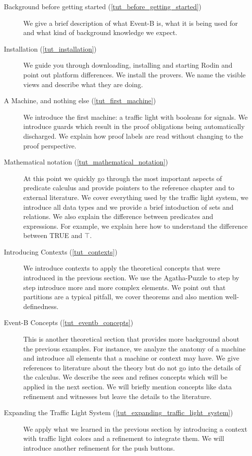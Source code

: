 \begin{description}
	\item[Background before getting started (\ref{tut_before_getting_started})] We give a brief description of what Event-B is, what it is being used for and what kind of background knowledge we expect.
	\item[Installation (\ref{tut_installation})] We guide you through downloading, installing and starting Rodin and point out platform differences.  We install the provers.  We name the visible views and describe what they are doing.
	\item[A Machine, and nothing else (\ref{tut_first_machine})] We introduce the first machine: a traffic light with booleans for signals.  We introduce guards which result in the proof obligations being automatically discharged.  We explain how proof labels are read without changing to the proof perspective.
	\item[Mathematical notation (\ref{tut_mathematical_notation})] At this point we quickly go through the most important aspects of predicate calculus and provide pointers to the reference chapter and to external literature.  We cover everything used by the traffic light system, we introduce all data types and we provide a brief intoduction of sets and relations.  We also explain the difference between predicates and expressions. For example, we explain here how to understand the difference between TRUE and $\top$.  
	\item[Introducing Contexts (\ref{tut_contexts})] We introduce contexts to apply the theoretical concepts that were introduced in the previous section.  We use the Agatha-Puzzle to step by step introduce more and more complex elements.  We point out that partitions are a typical pitfall, we cover theorems and also mention well-definedness.
	\item[Event-B Concepts (\ref{tut_eventb_concepts})] This is another theoretical section that provides more background about the previous examples.  For instance, we analyze the anatomy of a machine and introduce all elements that a machine or context may have. We give references to literature about the theory but do not go into the details of the  calculus.  We describe the sees and refines concepts which will be applied in the next section.  We will briefly mention concepts like data refinement and witnesses but leave the details to the literature.
	\item[Expanding the Traffic Light System (\ref{tut_expanding_traffic_light_system})]  We apply what we learned in the previous section by introducing a context with traffic light colors and a refinement to integrate them.  We will introduce another refinement for the push buttons.


\end{description}
